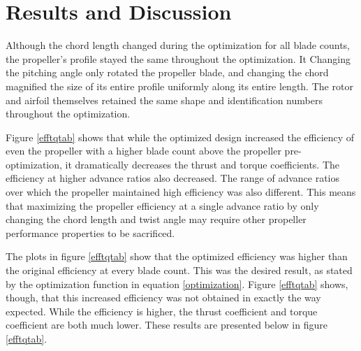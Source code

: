 \documentclass[journal ]{new-aiaa}
\begin{document}
\section{Results and Discussion}

Although the chord length changed during the optimization for all blade counts, the propeller's profile stayed the same throughout the optimization. It Changing the pitching angle only rotated the propeller blade, and changing the chord magnified the size of its entire profile uniformly along its entire length. The rotor and airfoil themselves retained the same shape and identification numbers throughout the optimization.

Figure \ref{efftqtab} shows that while the optimized design increased the efficiency of even the propeller with a higher blade count above the propeller pre-optimization, it dramatically decreases the thrust and torque coefficients. The efficiency at higher advance ratios also decreased. The range of advance ratios over which the propeller maintained high efficiency was also different. This means that maximizing the propeller efficiency at a single advance ratio by only changing the chord length and twist angle may require other propeller performance properties to be sacrificed.

The plots in figure \eqref{efftqtab} show that the optimized efficiency was higher than the original efficiency at every blade count. This was the desired result, as stated by the optimization function in equation \ref{optimization}. Figure \eqref{efftqtab} shows, though, that this increased efficiency was not obtained in exactly the way expected. While the efficiency is higher, the thrust coefficient and torque coefficient are both much lower. These results are presented below in figure \eqref{efftqtab}.
\end{document}
